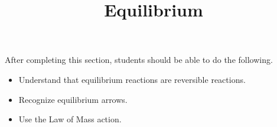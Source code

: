 \documentclass{ximera}
\title{Equilibrium}
\begin{document}
\begin{abstract}
\end{abstract}

\maketitle


After completing this section, students should be able to do the following.

\begin{itemize}
\item Understand that equilibrium reactions are reversible reactions.
\item Recognize equilibrium arrows. 
\item Use the Law of Mass action.

\end{itemize}

\end{document}
